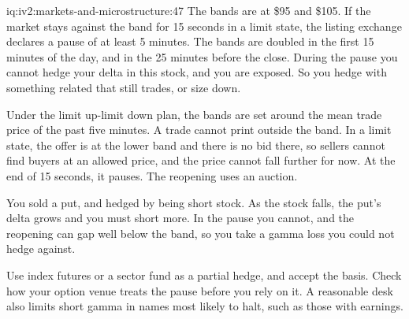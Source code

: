 \begin{solution}{iq:iv2:markets-and-microstructure:47}
The bands are at \$95 and \$105. If the market stays against the band for 15 seconds in a limit state, the listing exchange declares a pause of at least 5 minutes. The bands are doubled in the first 15 minutes of the day, and in the 25 minutes before the close. During the pause you cannot hedge your delta in this stock, and you are exposed. So you hedge with something related that still trades, or size down.

Under the limit up-limit down plan, the bands are set around the mean trade price of the past five minutes. A trade cannot print outside the band. In a limit state, the offer is at the lower band and there is no bid there, so sellers cannot find buyers at an allowed price, and the price cannot fall further for now. At the end of 15 seconds, it pauses. The reopening uses an auction.

You sold a put, and hedged by being short stock. As the stock falls, the put's delta grows and you must short more. In the pause you cannot, and the reopening can gap well below the band, so you take a gamma loss you could not hedge against.

Use index futures or a sector fund as a partial hedge, and accept the basis. Check how your option venue treats the pause before you rely on it. A reasonable desk also limits short gamma in names most likely to halt, such as those with earnings.

\end{solution}

